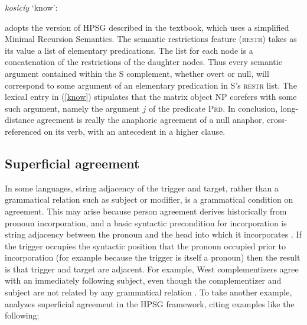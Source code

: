 \documentclass[output=paper
 	        ,biblatex
                ,babelshorthands
                ,newtxmath
                ,draftmode
                ,colorlinks, citecolor=brown
]{langscibook}
\begin{document}
 \begin{exe}
\ex\label{know}
\textit{kosicíy} `know': \\
\end{exe} 

\noindent
\citeauthor{LeSourd:2018} adopts the version of HPSG described in the \citet{Sag+etal:2003}
textbook, which uses a simplified Minimal Recursion Semantics. The semantic restrictions feature
(\textsc{restr}) takes as its value a list of elementary predications.  The list for each node is a
concatenation of the restrictions of the daughter nodes.  Thus every semantic argument contained
within the S complement, whether overt or null, will correspond to some argument of an elementary
predication in S's \textsc{restr} list. The lexical entry in (\ref{know}) stipulates that the matrix
object NP corefers with some such argument, namely the argument $j$ of the predicate
\textsc{Prd}. In conclusion,  long-distance agreement is really the
anaphoric agreement of a null anaphor, cross-referenced on its verb,
with an antecedent in a higher clause.

\subsection{Superficial agreement}
\label{agreement:sec-superficial-agreement}

In some languages, string adjacency of the trigger and target, rather than a grammatical relation
such as subject or modifier, is a grammatical condition on agreement. This may arise because person
agreement derives historically from pronoun incorporation, and a basic syntactic precondition for
incorporation is string adjacency between the pronoun and the head into which it incorporates
\citep{givon:1976,ariel:1999,wechsler+epps+coppock:2010,fuss:2005}.  If the trigger occupies the
syntactic position that the pronoun occupied prior to incorporation (for example because the trigger
is itself a pronoun) then the result is that trigger and target are adjacent.  For example, West
 complementizers agree with an immediately following subject, even though the
complementizer and subject are not related by any grammatical relation \citep{Haegeman:1992}.
To take another example, \citet{Borsley:2009} analyzes  superficial agreement in the HPSG framework, citing examples like the following:
\end{document}
